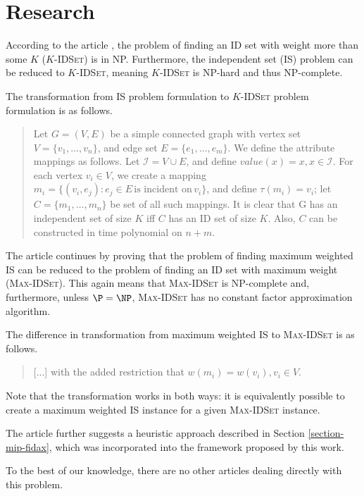 \chapter{Research}
\label{chapter-research}

According to the article \cite[Chapter~4]{fidax}, the problem of finding an ID set with weight more than some $K$ ($K$-\textsc{IDSet}) is in NP. Furthermore, the independent set (IS) problem can be reduced to $K$-\textsc{IDSet}, meaning $K$-\textsc{IDSet} is NP-hard and thus NP-complete.

The transformation from IS problem formulation to $K$-\textsc{IDSet} problem formulation is as follows.

\begin{quote}
Let $G = (V, E)$ be a simple connected graph with vertex set $V = \{v_1, \ldots, v_n\}$, and edge set $E = \{e_1, \ldots, e_m\}$. We define the attribute mappings as follows. Let $ \mathcal{I} = V \cup E$, and define $value(x) = x, x \in \mathcal{I}$. For each vertex $v_i \in V$, we create a mapping $m_i = \{(v_i, e_j): e_j \in E \,\text{is incident on}\, v_i \}$, and define $\tau(m_i) = v_i$; let $C = \{m_1, \ldots, m_n\}$ be set of all such mappings. It is clear that G has an independent set of size $K$ iff $C$ has an ID set of size $K$. Also, $C$ can be constructed in time polynomial on $n+m$.
\end{quote}

The article continues by proving that the problem of finding maximum weighted IS can be reduced to the problem of finding an ID set with maximum weight (\textsc{Max-IDSet}). This again means that \textsc{Max-IDSet} is NP-complete and, furthermore, unless $\P = \NP$, \textsc{Max-IDSet} has no constant factor approximation algorithm.

The difference in transformation from maximum weighted IS to \textsc{Max-IDSet} is as follows.

\begin{quote}
[...] with the added restriction that $w(m_i) = w(v_i), v_i \in V$.
\end{quote}

Note that the transformation works in both ways: it is equivalently possible to create a maximum weighted IS instance for a given \textsc{Max-IDSet} instance.

The article further suggests a heuristic approach described in Section \ref{section-mip-fidax}, which was incorporated into the framework proposed by this work.

To the best of our knowledge, there are no other articles dealing directly with this problem.\\

